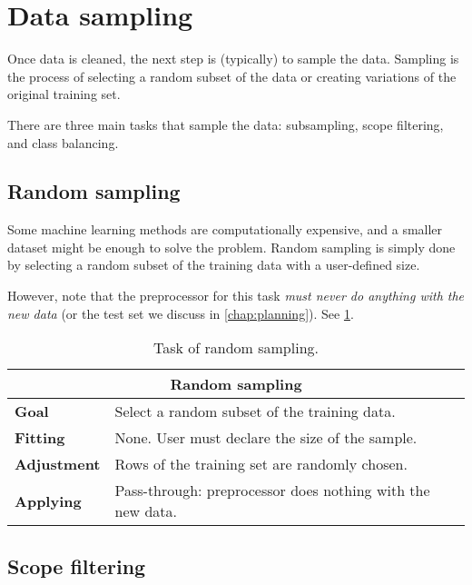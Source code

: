\section{Data sampling}

Once data is cleaned, the next step is (typically) to sample the data.  Sampling is the
process of selecting a random subset of the data or creating variations of the original
training set.

There are three main tasks that sample the data: subsampling, scope filtering, and class
balancing.

\subsection{Random sampling}
\label{sub:random-sampling}

Some machine learning methods are computationally expensive, and a smaller dataset might be
enough to solve the problem.  Random sampling is simply done by selecting a random subset
of the training data with a user-defined size.

However, note that the preprocessor for this task \emph{must never do anything with the
new data} (or the test set we discuss in \cref{chap:planning}).  See
\cref{tab:random-sampling}.

\begin{table}\caption{Task of random sampling.}
  \centering
  \begin{tabular}{lp{6cm}}
    \toprule
    \multicolumn{2}{c}{\textbf{Random sampling}} \\
    \midrule
    \textbf{Goal} &
      Select a random subset of the training data. \\
    \textbf{Fitting} &
      None. User must declare the size of the sample. \\
    \textbf{Adjustment} &
      Rows of the training set are randomly chosen. \\
    \textbf{Applying} &
      Pass-through: preprocessor does nothing with the new data. \\
    \bottomrule
  \end{tabular}
  \label{tab:random-sampling}
\end{table}

\subsection{Scope filtering}

